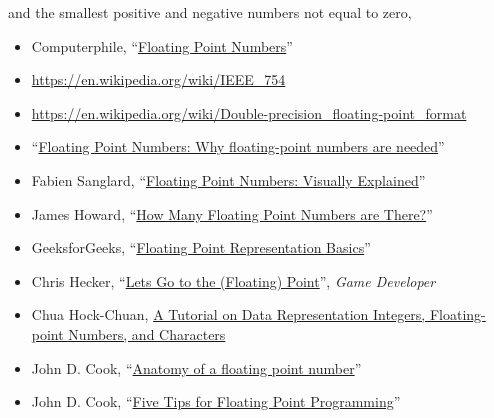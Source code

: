 \documentclass[]{book}
\newenvironment{Shaded}{\begin{snugshade}}{\end{snugshade}}
\newcommand{\CommentTok}[1]{\textcolor[rgb]{0.56,0.35,0.01}{\textit{#1}}}
\newcommand{\NormalTok}[1]{#1}
\newcommand{\OperatorTok}[1]{\textcolor[rgb]{0.81,0.36,0.00}{\textbf{#1}}}
\providecommand{\tightlist}{%
  \setlength{\itemsep}{0pt}\setlength{\parskip}{0pt}}
\theoremstyle{plain}
\theoremstyle{remark}
\begin{document}
and the smallest positive and negative numbers not equal to zero,

\begin{Shaded}
\end{Shaded}

\begin{itemize}
\tightlist
\item
  Computerphile,
  ``\href{https://www.youtube.com/watch?v=PZRI1IfStY0}{Floating Point
  Numbers}''
\item
  \url{https://en.wikipedia.org/wiki/IEEE_754}
\item
  \url{https://en.wikipedia.org/wiki/Double-precision_floating-point_format}
\item
  ``\href{https://floating-point-gui.de/formats/fp/}{Floating Point
  Numbers: Why floating-point numbers are needed}''
\item
  Fabien Sanglard,
  ``\href{http://fabiensanglard.net/floating_point_visually_explained/}{Floating
  Point Numbers: Visually Explained}''
\item
  James Howard,
  ``\href{https://jameshoward.us/2015/09/09/how-many-floating-point-numbers-are-there/}{How
  Many Floating Point Numbers are There?}''
\item
  GeeksforGeeks,
  ``\href{https://www.geeksforgeeks.org/floating-point-representation-basics/}{Floating
  Point Representation Basics}''
\item
  Chris Hecker,
  ``\href{http://chrishecker.com/images/f/fb/Gdmfp.pdf}{Lets Go to the
  (Floating) Point}'', \emph{Game Developer}
\item
  Chua Hock-Chuan,
  \href{http://www.ntu.edu.sg/home/ehchua/programming/java/datarepresentation.html}{A
  Tutorial on Data Representation Integers, Floating-point Numbers, and
  Characters}
\item
  John D. Cook,
  ``\href{https://www.johndcook.com/blog/2009/04/06/anatomy-of-a-floating-point-number/}{Anatomy
  of a floating point number}''
\item
  John D. Cook,
  ``\href{https://www.codeproject.com/Articles/29637/Five-Tips-for-Floating-Point-Programming}{Five
  Tips for Floating Point Programming}''
\end{itemize}
\end{document}

